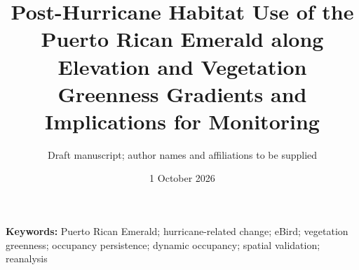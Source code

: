 \documentclass[11pt]{article}
\title{Post-Hurricane Habitat Use of the Puerto Rican Emerald along Elevation and Vegetation Greenness Gradients and Implications for Monitoring}
\author{Draft manuscript; author names and affiliations to be supplied}
\date{1 October 2026}
\begin{document}
\maketitle
\begin{abstract}\end{abstract}
\noindent\textbf{Keywords:} Puerto Rican Emerald; hurricane-related change; eBird; vegetation greenness; occupancy persistence; dynamic occupancy; spatial validation; reanalysis




\clearpage


\end{document}
